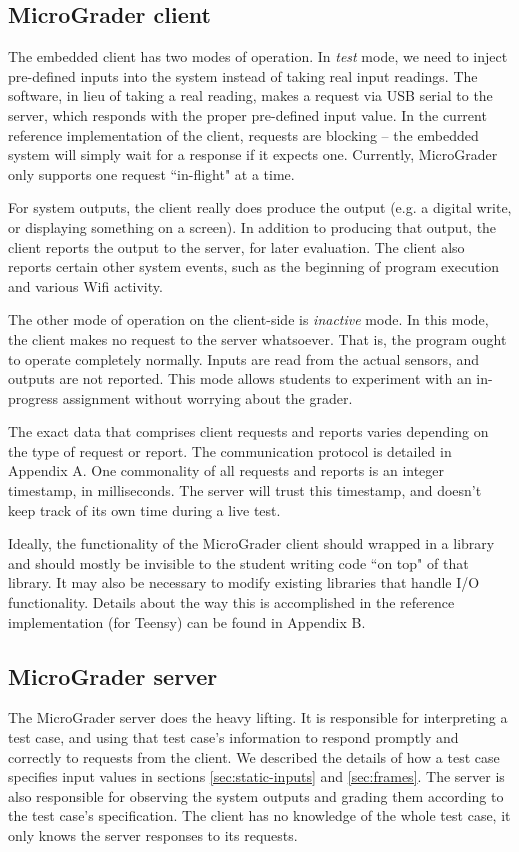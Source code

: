 \documentclass[12pt]{article}
\begin{document}
\subsection{MicroGrader client}
The embedded client has two modes of operation.  In \textit{test} mode, we need to inject pre-defined inputs into the system instead of taking real input readings.  The software, in lieu of taking a real reading, makes a request via USB serial to the server, which responds with the proper pre-defined input value.  In the current reference implementation of the client, requests are blocking -- the embedded system will simply wait for a response if it expects one.  Currently, MicroGrader only supports one request ``in-flight" at a time.

For system outputs, the client really does produce the output (e.g. a digital write, or displaying something on a screen).  In addition to producing that output, the client reports the output to the server, for later evaluation.  The client also reports certain other system events, such as the beginning of program execution and various Wifi activity.

The other mode of operation on the client-side is \textit{inactive} mode.  In this mode, the client makes no request to the server whatsoever.  That is, the program ought to operate completely normally.  Inputs are read from the actual sensors, and outputs are not reported.  This mode allows students to experiment with an in-progress assignment without worrying about the grader.

The exact data that comprises client requests and reports varies depending on the type of request or report.  The communication protocol is detailed in Appendix A.  One commonality of all requests and reports is an integer timestamp, in milliseconds.  The server will trust this timestamp, and doesn't keep track of its own time during a live test.

Ideally, the functionality of the MicroGrader client should wrapped in a library and should mostly be invisible to the student writing code ``on top" of that library.  It may also be necessary to modify existing libraries that handle I/O functionality.  Details about the way this is accomplished in the reference implementation (for Teensy) can be found in Appendix B.

\subsection{MicroGrader server}
The MicroGrader server does the heavy lifting.  It is responsible for interpreting a test case, and using that test case's information to respond promptly and correctly to requests from the client.  We described the details of how a test case specifies input values in sections \ref{sec:static-inputs} and \ref{sec:frames}.  The server is also responsible for observing the system outputs and grading them according to the test case's specification.  The client has no knowledge of the whole test case, it only knows the server responses to its requests.
\end{document}
